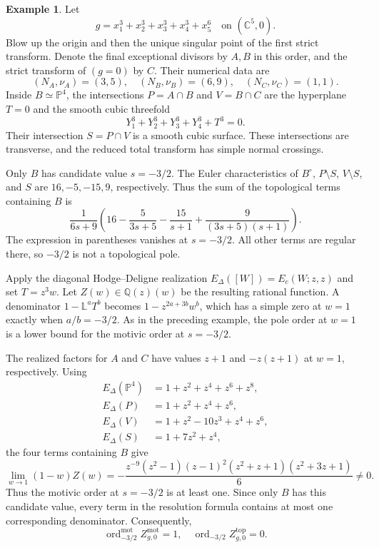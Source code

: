 \documentclass[12pt]{amsart}
\numberwithin{equation}{section}
\theoremstyle{plain}
\theoremstyle{definition}
\newtheorem{example}[theorem]{Example}
\theoremstyle{remark}
\theoremstyle{definition}
\DeclareMathOperator{\ord}{ord}
\newcommand{\Q}{\mathbb Q}
\newcommand{\Lef}{\mathbb L}
\begin{document}
\begin{example}\label{ex:motivic-fivefold-support-gap}
Let
\[
g=x_1^3+x_2^3+x_3^3+x_4^3+x_5^6
\quad\text{on }(\mathbb C^5,0).
\]
Blow up the origin and then the unique singular point of the first strict transform. Denote the final exceptional divisors by $A,B$ in this order, and the strict transform of $(g=0)$ by $C$. Their numerical data are
\[
(N_A,\nu_A)=(3,5),
\quad
(N_B,\nu_B)=(6,9),
\quad
(N_C,\nu_C)=(1,1).
\]
Inside $B\simeq\mathbb P^4$, the intersections $P=A\cap B$ and $V=B\cap C$ are the hyperplane $T=0$ and the smooth cubic threefold
\[
Y_1^3+Y_2^3+Y_3^3+Y_4^3+T^3=0.
\]
Their intersection $S=P\cap V$ is a smooth cubic surface. These intersections are transverse, and the reduced total transform has simple normal crossings.

Only $B$ has candidate value $s=-3/2$. The Euler characteristics of $B^\circ$, $P\setminus S$, $V\setminus S$, and $S$ are $16,-5,-15,9$, respectively. Thus the sum of the topological terms containing $B$ is
\[
\frac{1}{6s+9}
\left(
16-\frac{5}{3s+5}-\frac{15}{s+1}
+\frac{9}{(3s+5)(s+1)}
\right).
\]
The expression in parentheses vanishes at $s=-3/2$. All other terms are regular there, so $-3/2$ is not a topological pole.

Apply the diagonal Hodge--Deligne realization $E_\Delta([W])=E_c(W;z,z)$ and set $T=z^3w$. Let $Z(w)\in\Q(z)(w)$ be the resulting rational function. A denominator $1-\Lef^aT^b$ becomes $1-z^{2a+3b}w^b$, which has a simple zero at $w=1$ exactly when $a/b=-3/2$. As in the preceding example, the pole order at $w=1$ is a lower bound for the motivic order at $s=-3/2$.

The realized factors for $A$ and $C$ have values $z+1$ and $-z(z+1)$ at $w=1$, respectively. Using
\[
\begin{aligned}
E_\Delta(\mathbb P^4)&=1+z^2+z^4+z^6+z^8,\\
E_\Delta(P)&=1+z^2+z^4+z^6,\\
E_\Delta(V)&=1+z^2-10z^3+z^4+z^6,\\
E_\Delta(S)&=1+7z^2+z^4,
\end{aligned}
\]
the four terms containing $B$ give
\[
\lim_{w\to1}(1-w)Z(w)
=
-\frac{z^{-9}(z^2-1)(z-1)^2(z^2+z+1)(z^2+3z+1)}{6}
\ne0.
\]
Thus the motivic order at $s=-3/2$ is at least one. Since only $B$ has this candidate value, every term in the resolution formula contains at most one corresponding denominator. Consequently,
\[
\ord_{-3/2}^{\mathrm{mot}}Z^{\mathrm{mot}}_{g,0}=1,
\quad
\ord_{-3/2}Z^{\mathrm{top}}_{g,0}=0.
\]
\end{example}
\end{document}
